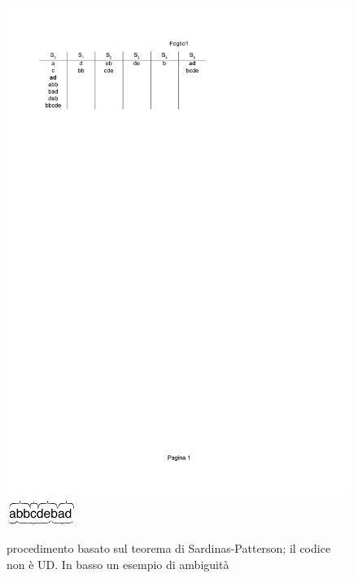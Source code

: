 \begin{figure}[htp]
\begin{center}
	\includegraphics[width=\textwidth]{img/patt1.pdf}
	\includegraphics[width=0.2\textwidth]{img/patt1b.pdf}
\caption{procedimento basato sul teorema di Sardinas-Patterson; il codice non è UD. In basso un esempio di ambiguità}
\label{fig:0019}
\end{center}
\end{figure}

